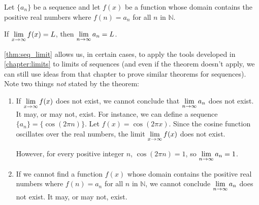 \begin{theorem}\label{thm:seq_limit}%
Let $\{a_n\}$ be a sequence and let $f(x)$ be a function whose domain contains the positive real numbers where $f(n) = a_n$ for all $n$ in $\mathbb{N}$.\bigskip

If $\displaystyle \lim_{x\to\infty} f(x) = L$, then $\displaystyle\lim_{n\to\infty} a_n = L$.
\end{theorem}

\autoref{thm:seq_limit} allows us, in certain cases, to apply the tools developed in \autoref{chapter:limits} to limits of sequences (and even if the theorem doesn't apply, we can still use ideas from that chapter to prove similar theorems for sequences). Note two things \emph{not} stated by the theorem:
	\begin{enumerate}
		\item If $\displaystyle \lim_{x\to\infty}f(x)$ does not exist, we cannot conclude that $\displaystyle\lim_{n\to\infty} a_n$ does not exist. It may, or may not, exist. For instance, we can define a sequence $\{a_n\} = \{\cos(2\pi n)\}$. Let $f(x) = \cos (2\pi x)$. Since the cosine function oscillates over the real numbers, the limit $\displaystyle \lim_{x\to\infty}f(x)$ does not exist. 
		
		However, for every positive integer $n$, $\cos(2\pi n) = 1$, so $\displaystyle \lim_{n\to\infty} a_n = 1$.
		
		\item	If we cannot find a function $f(x)$ whose domain contains the positive real numbers where $f(n) = a_n$ for all $n$ in $\mathbb{N}$, we cannot conclude $\displaystyle\lim_{n\to\infty} a_n$ does not exist. It may, or may not, exist.
	\end{enumerate}


